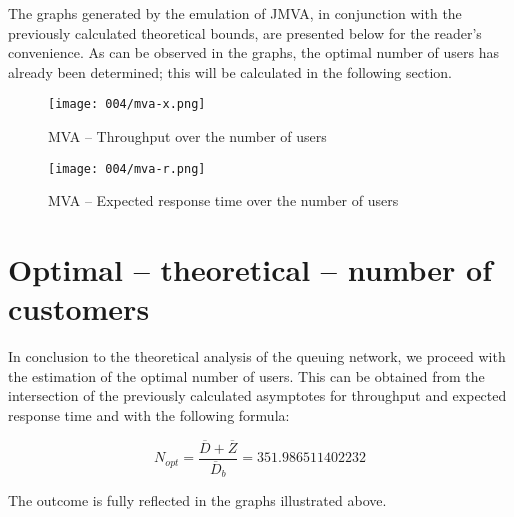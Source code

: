 The graphs generated by the emulation of JMVA, in conjunction with the previously calculated theoretical bounds, are presented below for the reader's convenience.
As can be observed in the graphs, the optimal number of users has already been determined; this will be calculated in the following section.

\begin{figure}[h]
	\centering
	\texttt{[image: 004/mva-x.png]}
	\caption{MVA -- Throughput over the number of users}
\end{figure}

\begin{figure}[h]
	\centering
	\texttt{[image: 004/mva-r.png]}
	\caption{MVA -- Expected response time over the number of users}
\end{figure}

\clearpage

\section{Optimal -- theoretical -- number of customers}

In conclusion to the theoretical analysis of the queuing network, we proceed with the estimation of the optimal number of users.
This can be obtained from the intersection of the previously calculated asymptotes for throughput and expected response time and with the following formula:

\begin{equation}
	\label{eq:optimal-number-of-users}
	N_{opt} = \frac{\overline{D} + \overline{Z}}{\overline{D}_b} = \num[round-mode=places, round-precision=5]{351.986511402232}
\end{equation}

The outcome is fully reflected in the graphs illustrated above.
